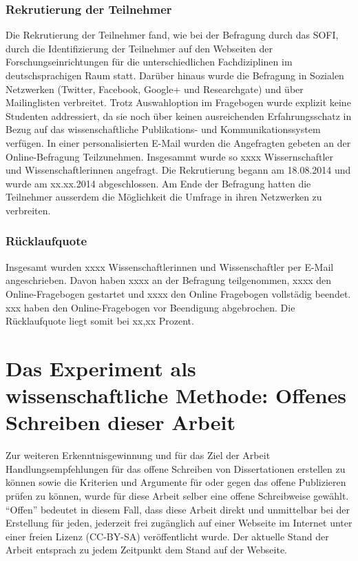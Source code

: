 \subsubsection{Rekrutierung der Teilnehmer}
Die Rekrutierung der Teilnehmer fand, wie bei der Befragung durch das SOFI, durch die Identifizierung der Teilnehmer auf den Webseiten der Forschungseinrichtungen für die unterschiedlichen Fachdiziplinen im deutschsprachigen Raum statt. Darüber hinaus wurde die Befragung in Sozialen Netzwerken (Twitter, Facebook, Google+ und Researchgate) und über Mailinglisten verbreitet. Trotz Auswahloption im Fragebogen wurde explizit keine Studenten addressiert, da sie noch über keinen ausreichenden Erfahrungsschatz in Bezug auf das wissenschaftliche Publikations- und Kommunikationssystem verfügen. In einer personalisierten E-Mail wurden die Angefragten gebeten an der Online-Befragung Teilzunehmen. Insgesammt wurde so xxxx Wissernschaftler und Wissenschaftlerinnen angefragt. Die Rekrutierung begann am 18.08.2014 und wurde am xx.xx.2014 abgeschlossen. Am Ende der Befragung hatten die Teilnehmer ausserdem die Möglichkeit die Umfrage in ihren Netzwerken zu verbreiten.

\subsubsection{Rücklaufquote}
Insgesamt wurden xxxx Wissenschaftlerinnen und Wissenschaftler per E-Mail angeschrieben. Davon haben xxxx an der Befragung teilgenommen, xxxx den Online-Fragebogen gestartet und xxxx den Online Fragebogen vollstädig beendet. xxx haben den Online-Fragebogen vor Beendigung abgebrochen. Die Rücklaufquote liegt somit bei xx,xx Prozent. 

\section{Das Experiment als wissenschaftliche Methode: Offenes Schreiben dieser Arbeit}
Zur weiteren Erkenntnisgewinnung und für das Ziel der Arbeit Handlungsempfehlungen für das offene Schreiben von Dissertationen erstellen zu können sowie die Kriterien und Argumente für oder gegen das offene Publizieren prüfen zu können, wurde für diese Arbeit selber eine offene Schreibweise gewählt. “Offen” bedeutet in diesem Fall, dass diese Arbeit direkt und unmittelbar bei der Erstellung für jeden, jederzeit frei zugänglich auf einer Webseite im Internet unter einer freien Lizenz (CC-BY-SA) veröffentlicht wurde. Der aktuelle Stand der Arbeit entsprach zu jedem Zeitpunkt dem Stand auf der Webseite. 

